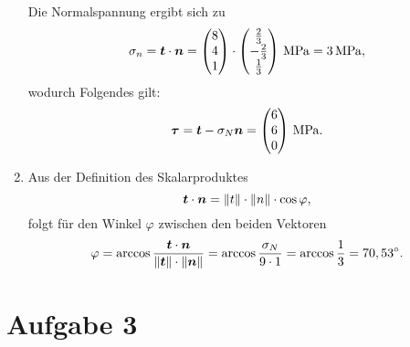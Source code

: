 \documentclass{exercise}
\begin{document}
\begin{enumerate}
\[        \]
        Die Normalspannung ergibt sich zu
        \[
            \sigma_n = \bm{t} \cdot \bm{n} = \begin{pmatrix}
                8\\
                4\\
                1
            \end{pmatrix} \cdot \begin{pmatrix}
                \frac{2}{3}\\
                -\frac{2}{3}\\
                \frac{1}{3}
            \end{pmatrix}\sis{\mega\pascal} = 3\sis{\mega\pascal},
        \]
        wodurch Folgendes gilt:
        \[
            \bm{\tau} = \bm{t} - \sigma_N\bm{n} = \begin{pmatrix}
                6\\
                6\\
                0
            \end{pmatrix}\sis{\mega\pascal}.
        \]
        \item Aus der Definition des Skalarproduktes
        \[
            \bm{t} \cdot \bm{n} = \norm*{t} \cdot \norm*{n} \cdot \cos\varphi,
        \]
        folgt für den Winkel \(\varphi\) zwischen den beiden Vektoren
        \[
            \varphi = \arccos\frac{\bm{t} \cdot \bm{n}}{\norm*{\bm{t}} \cdot \norm*{\bm{n}}} = \arccos\frac{\sigma_N}{9 \cdot 1} = \arccos\frac{1}{3} = 70,53^\circ.
        \]
    \end{enumerate}


    \section*{Aufgabe 3}
\end{document}
